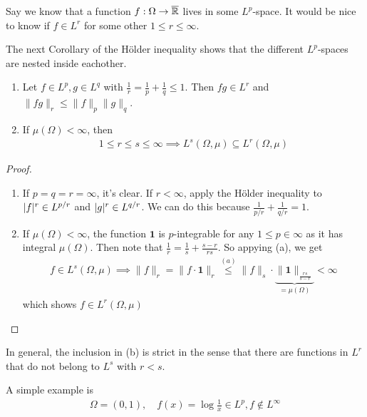 Say we know that a function $f: \Omega \to \overline{\mathbb{R}}$ lives in some $L^{p}$-space.
It would be nice to know if $f\in L^{r}$ for some other $1 \leq r \leq \infty$.

The next Corollary of the Hölder inequality shows that the different $L^{p}$-spaces are nested inside eachother.

\begin{cor}[] \label{cor:stronger-hoelder}
  \phantom{a}
  \begin{enumerate}
    \item Let $f \in L^{p}, g \in L^{q}$ with $\frac{1}{r} = \frac{1}{p} + \frac{1}{q} \leq 1$.
      Then $fg \in L^{r}$ and $\|fg\|_r \leq \|f\|_p \|g\|_q$.
    \item If $\mu(\Omega) < \infty$, then
      \begin{align*}
        1 \leq r \leq s \leq \infty \implies L^{s}(\Omega,\mu) \subseteq L^{r}(\Omega,\mu)
      \end{align*}
  \end{enumerate}
\end{cor}
\begin{proof}
  \phantom{a}
  \begin{enumerate}
    \item 
  If $p=q=r = \infty$, it's clear. If $r < \infty$, apply the Hölder inequality to $\vert f\vert^{r} \in L^{p/r}$ and $\vert g\vert^{r} \in L^{q/r}$.
  We can do this because $\frac{1}{p/r} + \frac{1}{q/r} = 1$.

    \item 
      If $\mu(\Omega) < \infty$, the function $\bm{1}$ is $p$-integrable for any $1 \leq p \in \infty$ as it has integral $\mu(\Omega)$.
      Then note that $\frac{1}{r} = \frac{1}{s} + \frac{s-r}{rs}$. So appying (a), we get
      \begin{align*}
        f \in L^{s}(\Omega,\mu) 
        \implies 
        \|f\|_r = \| f\cdot \bm{1}\|_r
        \stackrel{(a)}{\leq}\|f\|_s \cdot \underbrace{\|\bm{1}\|_{\frac{rs}{s-r}}}_{= \mu(\Omega)} < \infty
      \end{align*}
      which shows $f \in L^{r}(\Omega,\mu)$
  \end{enumerate}
\end{proof}

\begin{rem}[]
  In general, the inclusion in (b) is strict in the sense that there are functions in $L^{r}$ that do not belong to $L^{s}$ with $r < s$.

  A simple example is
  \begin{align*}
    \Omega = (0,1), \quad f(x) = \log \frac{1}{x} \in L^{p}, f \notin L^{\infty}
  \end{align*}
\end{rem}


